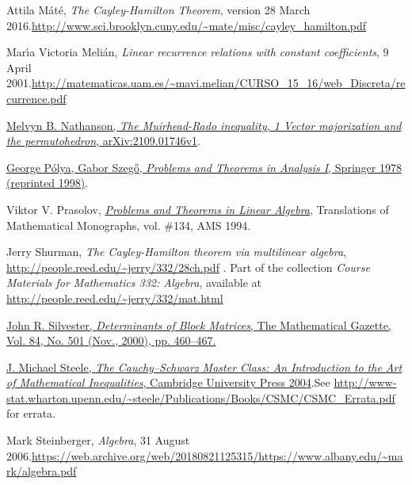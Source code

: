 \documentclass[numbers=enddot,12pt,final,onecolumn,notitlepage]{scrartcl}%
\numberwithin{exer}{subsection}
\theoremstyle{definition}
\begin{document}
\begin{thebibliography}{99999999}
Attila M\'{a}t\'{e}, \textit{The Cayley-Hamilton
Theorem}, version 28 March 2016.\newline\url{http://www.sci.brooklyn.cuny.edu/~mate/misc/cayley_hamilton.pdf}

Mar\'{\i}a Victoria Meli\'{a}n, \textit{Linear
recurrence relations with constant coefficients}, 9 April 2001.\newline\url{http://matematicas.uam.es/~mavi.melian/CURSO_15_16/web_Discreta/recurrence.pdf}

\href{https://arxiv.org/abs/2109.01746v1}{Melvyn
B. Nathanson, \textit{The Muirhead-Rado inequality, 1 Vector majorization and
the permutohedron}, arXiv:2109.01746v1}.

%
\href{https://doi.org/10.1007/978-3-642-61983-0}{George P\'{o}lya, Gabor
Szeg\H{o}, \textit{Problems and Theorems in Analysis I}, Springer 1978
(reprinted 1998)}.

Viktor V. Prasolov,
\textit{\href{http://www2.math.su.se/~mleites/books/prasolov-1994-problems.pdf}{\textit{Problems
and Theorems in Linear Algebra}}}, Translations of Mathematical Monographs,
vol. \#134, AMS 1994.

Jerry Shurman, \textit{The Cayley-Hamilton theorem
via multilinear algebra}, \url{http://people.reed.edu/~jerry/332/28ch.pdf} .
Part of the collection \textit{Course Materials for Mathematics 332: Algebra},
available at \url{http://people.reed.edu/~jerry/332/mat.html}

%
\href{https://web.archive.org/web/20140505161153/http://www.mth.kcl.ac.uk/~jrs/gazette/blocks.pdf}{John
R. Silvester, \textit{Determinants of Block Matrices}, The Mathematical
Gazette, Vol. 84, No. 501 (Nov., 2000), pp. 460--467.}

%
\href{http://www.ma.huji.ac.il/~ehudf/courses/Ineq09/The Cauchy-Schwarz Master Class .pdf}{J.
Michael Steele, \textit{The Cauchy--Schwarz Master Class: An Introduction to
the Art of Mathematical Inequalities}, Cambridge University Press
2004}.\newline See
\url{http://www-stat.wharton.upenn.edu/~steele/Publications/Books/CSMC/CSMC_Errata.pdf}
for errata.

Mark Steinberger, \textit{Algebra}, 31 August
2006.\newline\url{https://web.archive.org/web/20180821125315/https://www.albany.edu/~mark/algebra.pdf}


\end{thebibliography}
\end{document}
